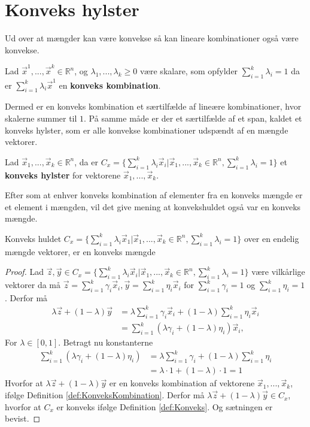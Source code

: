 \section{Konveks hylster}
Ud over at mængder kan være konvekse så kan lineare kombinationer også være konvekse.
\begin{defn}
Lad $\vec{x}^1, ...,\vec{x}^k \in \mathds{R}^n$, og $\lambda_1,..., \lambda_k \geq 0 $ være skalare, som opfylder $\sum_{i=1}^k \lambda_i =1$ da er $\sum_{i=1}^k \lambda_i \vec{x}^1$ en \textbf{konveks kombination}.
\label{def:KonveksKombination}
\end{defn}
Dermed er en konveks kombination et særtilfælde af lineære kombinationer, hvor skalerne summer til $1$.
På samme måde er der et særtilfælde af et span, kaldet et konveks hylster, som er alle konvekse kombinationer udspændt af en mængde vektorer.
\begin{defn}
Lad $\vec{x}_1, ...,\vec{x}_k \in \mathds{R}^n$, da er $C_{x} = \{\sum_{i=1}^k \lambda_i \vec{x}_i| \vec{x}_1, ...,\vec{x}_k \in \mathds{R}^n, \sum_{i=1}^k \lambda_i =1\}$ et \textbf{konveks hylster} for vektorene $\vec{x}_1, ...,\vec{x}_k$. 
\label{def:Konvekshuld}
\end{defn}
Efter som at enhver konveks kombination af elementer fra en konveks mængde er et element i mængden, vil det give mening at konvekshuldet også var en konveks mængde.
\begin{stn}
Konveks huldet $C_x = \{\sum_{i=1}^k \lambda_i \vec{x}_1| \vec{x}_1, ...,\vec{x}_k \in \mathds{R}^n, \sum_{i=1}^k \lambda_i =1\}$ over en endelig mængde vektorer, er en konveks mængde
\end{stn}
\begin{proof}
Lad $\vec{z}, \vec{y}\in C_x = \{\sum_{i=1}^k \lambda_i \vec{x}_i| \vec{x}_1, ...,\vec{x}_k \in \mathds{R}^n, \sum_{i=1}^k \lambda_i =1\}$ være vilkårlige vektorer da må $\vec{z}= \sum_{i=1}^k \gamma_i \vec{x}_i, \vec{y}= \sum_{i=1}^k \eta_i \vec{x}_i$ for $\sum_{i=1}^k \gamma_i = 1$ og  $\sum_{i=1}^k \eta_i = 1$. 
Derfor må
\begin{align*}
	\lambda \vec{z} + (1- \lambda) \vec{y} &= \lambda\sum_{i=1}^k \gamma_i \vec{x}_i + (1-\lambda)\sum_{i=1}^k \eta_i \vec{x}_i
	\\ &=\sum_{i=1}^k (\lambda \gamma_i+(1-\lambda)\eta_i )\vec{x}_i,
\end{align*}
For $\lambda \in [0,1]$.
Betragt nu konstanterne 
\begin{align*}
	\sum_{i=1}^k (\lambda \gamma_i+(1-\lambda)\eta_i ) &= \lambda \sum_{i=1}^k \gamma_i + (1 - \lambda) \sum_{i=1}^k \eta_i 
	\\ &= \lambda \cdot 1 + (1 - \lambda) \cdot 1 = 1
\end{align*}
Hvorfor at $\lambda \vec{z} + (1- \lambda) \vec{y} $ er en konveks kombination af vektorene $\vec{x}_1, ...,\vec{x}_k $, ifølge Definition \ref{def:KonveksKombination}. 
Derfor må $ \lambda \vec{z} + (1- \lambda) \vec{y} \in C_x$, hvorfor at $C_x$ er konveks ifølge Definition \ref{def:Konveks}.
Og sætningen er bevist.
\end{proof}
